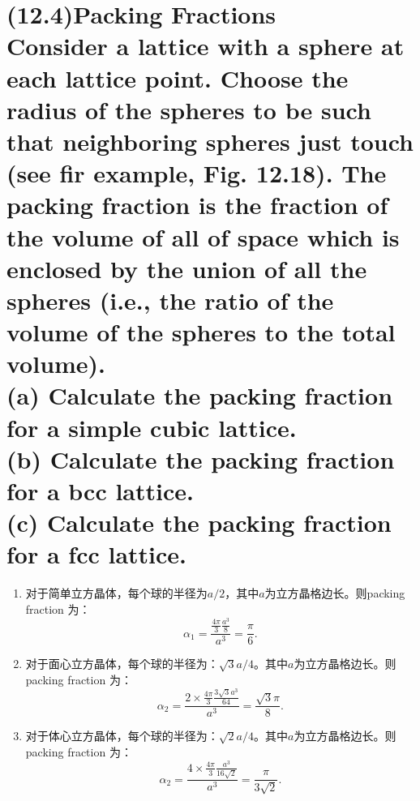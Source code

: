\documentclass[reqno,a4paper,12pt]{amsart}
\begin{document}
\section{(12.4)\textbf{Packing Fractions} \\
Consider a lattice with a sphere at each lattice point. Choose the radius of the spheres to be such that neighboring spheres just touch (see fir example, Fig. 12.18). The packing fraction is the fraction of the volume of all of space which is enclosed by the union of all the spheres (i.e., the ratio of the volume of the spheres to the total volume). \\
(a) Calculate the packing fraction for a simple cubic lattice. \\
(b) Calculate the packing fraction for a bcc lattice. \\
(c) Calculate the packing fraction for a fcc lattice.}
\begin{tcolorbox}[breakable, colback = black!5!white, colframe = black]
\begin{enumerate}[itemindent = -1.5em]
\item 对于简单立方晶体，每个球的半径为$a/2$，其中$a$为立方晶格边长。则packing fraction 为：
\[
	\alpha_1 = \frac{\frac{4\pi}{3}\frac{a^3}{8}}{a^3} = \frac{\pi}{6}.
\]
\item 对于面心立方晶体，每个球的半径为：$\sqrt{3}a/4$。其中$a$为立方晶格边长。则packing fraction 为：
\[
	\alpha_2 = \frac{2\times \frac{4\pi}{3}\frac{3\sqrt{3}a^3}{64}}{a^3} = \frac{\sqrt{3}\pi}{8}.
\]
\item 对于体心立方晶体，每个球的半径为：$\sqrt{2}a/4$。其中$a$为立方晶格边长。则packing fraction 为：
\[
	\alpha_2 = \frac{4\times \frac{4\pi}{3}\frac{a^3}{16\sqrt{2}}}{a^3} = \frac{\pi}{3\sqrt{2}}.
\]
\end{enumerate}
\end{tcolorbox}
\end{document}
